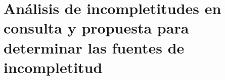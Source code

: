 \chapter{Análisis de incompletitudes en consulta y propuesta para determinar las fuentes de incompletitud} \label{chap:analisisFuenteIncompletitud}

